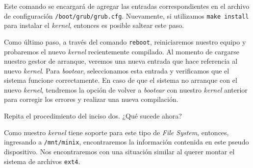 \begin{questions}
\begin{parts}
Este comando se encargará de agregar las entradas correspondientes en el
archivo de configuración \texttt{/boot/grub/grub.cfg}. Nuevamente, si
utilizamos \texttt{make install} para instalar el \textit{kernel}, entonces
es posible saltear este paso.

  \end{parts}

  \question Como último paso, a través del comando \texttt{reboot},
  reiniciaremos nuestro equipo y probaremos el nuevo \textit{kernel}
  recientemente compilado. Al momento de cargarse nuestro gestor de
  arranque, veremos una nueva entrada que hace referencia al nuevo
  \textit{kernel}. Para \textit{bootear}, seleccionamos esta entrada y
  verificamos que el sistema funcione correctamente. En caso de que el
  sistema no arranque con el nuevo \textit{kernel}, tendremos la opción de
  volver a \textit{bootear} con nuestro \textit{kernel} anterior para
  corregir los errores y realizar una nueva compilación.

  \question Repita el procedimiento del inciso dos. ¿Qué sucede ahora?

  Como nuestro \textit{kernel} tiene soporte para este tipo de \textit{File
    System}, entonces, ingresando a \texttt{/mnt/minix}, encontraremos la
  información contenida en este pseudo dispositivo. Nos encontraremos con
  una situación similar al querer montar el sistema de archivos
  \texttt{ext4}.

\end{questions}
